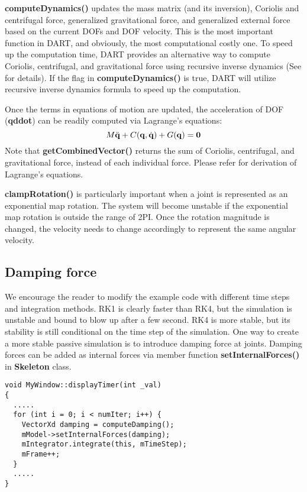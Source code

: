 \textbf{computeDynamics()} updates the mass matrix (and its
inversion), Coriolis and centrifugal force, generalized gravitational force,
and generalized external force based on the current DOFs and DOF
velocity. This is the most important function in DART, and obviously,
the most computational costly one. To speed up the computation time,
DART provides an alternative way to compute Coriolis, centrifugal, and
gravitational force using recursive inverse dynamics (See
\cite{dynamics-tutorial} for details). If the flag in
\textbf{computeDynamics()} is true, DART will utilize recursive
inverse dynamics formula to speed up the computation.

Once the terms in equations of motion are updated, the acceleration of
DOF (\textbf{qddot}) can be readily computed via Lagrange's equations:
\begin{equation}
M \ddot{\mathbf{q}} + C(\mathbf{q}, \dot{\mathbf{q}}) + G(\mathbf{q}) = \mathbf{0}
\end{equation}
Note that \textbf{getCombinedVector()} returns the sum of Coriolis,
centrifugal, and gravitational force, instead of each individual
force. Please refer \cite{dynamic-tutorial} for derivation of
Lagrange's equations.

\textbf{clampRotation()} is particularly important when a joint is
represented as an exponential map rotation. The system will become
unstable if the exponential map rotation is outside the range of
2PI. Once the rotation magnitude is changed, the velocity needs to
change accordingly to represent the same angular velocity.

\subsection{Damping force}
We encourage the reader to modify the example code with different time
steps and integration methods. RK1 is clearly faster than RK4, but the
simulation is unstable and bound to blow up after a few second. RK4 is
more stable, but its stability is still conditional on the time step
of the simulation. One way to create a more stable passive simulation
is to introduce damping force at joints. Damping forces can be added
as internal forces via member function \textbf{setInternalForces()} in
\textbf{Skeleton} class. 

\ttfamily
\begin{lstlisting}[caption=MyWindow.cpp]
void MyWindow::displayTimer(int _val)
{
  .....
  for (int i = 0; i < numIter; i++) {
    VectorXd damping = computeDamping();
    mModel->setInternalForces(damping);
    mIntegrator.integrate(this, mTimeStep);
    mFrame++;
  }
  .....
}
\end{lstlisting}
\rmfamily

